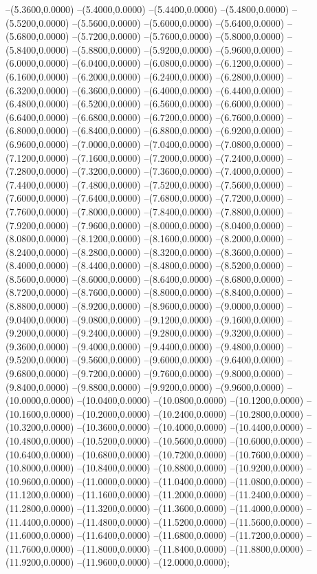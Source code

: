 {	--(5.3600,0.0000)
	--(5.4000,0.0000)
	--(5.4400,0.0000)
	--(5.4800,0.0000)
	--(5.5200,0.0000)
	--(5.5600,0.0000)
	--(5.6000,0.0000)
	--(5.6400,0.0000)
	--(5.6800,0.0000)
	--(5.7200,0.0000)
	--(5.7600,0.0000)
	--(5.8000,0.0000)
	--(5.8400,0.0000)
	--(5.8800,0.0000)
	--(5.9200,0.0000)
	--(5.9600,0.0000)
	--(6.0000,0.0000)
	--(6.0400,0.0000)
	--(6.0800,0.0000)
	--(6.1200,0.0000)
	--(6.1600,0.0000)
	--(6.2000,0.0000)
	--(6.2400,0.0000)
	--(6.2800,0.0000)
	--(6.3200,0.0000)
	--(6.3600,0.0000)
	--(6.4000,0.0000)
	--(6.4400,0.0000)
	--(6.4800,0.0000)
	--(6.5200,0.0000)
	--(6.5600,0.0000)
	--(6.6000,0.0000)
	--(6.6400,0.0000)
	--(6.6800,0.0000)
	--(6.7200,0.0000)
	--(6.7600,0.0000)
	--(6.8000,0.0000)
	--(6.8400,0.0000)
	--(6.8800,0.0000)
	--(6.9200,0.0000)
	--(6.9600,0.0000)
	--(7.0000,0.0000)
	--(7.0400,0.0000)
	--(7.0800,0.0000)
	--(7.1200,0.0000)
	--(7.1600,0.0000)
	--(7.2000,0.0000)
	--(7.2400,0.0000)
	--(7.2800,0.0000)
	--(7.3200,0.0000)
	--(7.3600,0.0000)
	--(7.4000,0.0000)
	--(7.4400,0.0000)
	--(7.4800,0.0000)
	--(7.5200,0.0000)
	--(7.5600,0.0000)
	--(7.6000,0.0000)
	--(7.6400,0.0000)
	--(7.6800,0.0000)
	--(7.7200,0.0000)
	--(7.7600,0.0000)
	--(7.8000,0.0000)
	--(7.8400,0.0000)
	--(7.8800,0.0000)
	--(7.9200,0.0000)
	--(7.9600,0.0000)
	--(8.0000,0.0000)
	--(8.0400,0.0000)
	--(8.0800,0.0000)
	--(8.1200,0.0000)
	--(8.1600,0.0000)
	--(8.2000,0.0000)
	--(8.2400,0.0000)
	--(8.2800,0.0000)
	--(8.3200,0.0000)
	--(8.3600,0.0000)
	--(8.4000,0.0000)
	--(8.4400,0.0000)
	--(8.4800,0.0000)
	--(8.5200,0.0000)
	--(8.5600,0.0000)
	--(8.6000,0.0000)
	--(8.6400,0.0000)
	--(8.6800,0.0000)
	--(8.7200,0.0000)
	--(8.7600,0.0000)
	--(8.8000,0.0000)
	--(8.8400,0.0000)
	--(8.8800,0.0000)
	--(8.9200,0.0000)
	--(8.9600,0.0000)
	--(9.0000,0.0000)
	--(9.0400,0.0000)
	--(9.0800,0.0000)
	--(9.1200,0.0000)
	--(9.1600,0.0000)
	--(9.2000,0.0000)
	--(9.2400,0.0000)
	--(9.2800,0.0000)
	--(9.3200,0.0000)
	--(9.3600,0.0000)
	--(9.4000,0.0000)
	--(9.4400,0.0000)
	--(9.4800,0.0000)
	--(9.5200,0.0000)
	--(9.5600,0.0000)
	--(9.6000,0.0000)
	--(9.6400,0.0000)
	--(9.6800,0.0000)
	--(9.7200,0.0000)
	--(9.7600,0.0000)
	--(9.8000,0.0000)
	--(9.8400,0.0000)
	--(9.8800,0.0000)
	--(9.9200,0.0000)
	--(9.9600,0.0000)
	--(10.0000,0.0000)
	--(10.0400,0.0000)
	--(10.0800,0.0000)
	--(10.1200,0.0000)
	--(10.1600,0.0000)
	--(10.2000,0.0000)
	--(10.2400,0.0000)
	--(10.2800,0.0000)
	--(10.3200,0.0000)
	--(10.3600,0.0000)
	--(10.4000,0.0000)
	--(10.4400,0.0000)
	--(10.4800,0.0000)
	--(10.5200,0.0000)
	--(10.5600,0.0000)
	--(10.6000,0.0000)
	--(10.6400,0.0000)
	--(10.6800,0.0000)
	--(10.7200,0.0000)
	--(10.7600,0.0000)
	--(10.8000,0.0000)
	--(10.8400,0.0000)
	--(10.8800,0.0000)
	--(10.9200,0.0000)
	--(10.9600,0.0000)
	--(11.0000,0.0000)
	--(11.0400,0.0000)
	--(11.0800,0.0000)
	--(11.1200,0.0000)
	--(11.1600,0.0000)
	--(11.2000,0.0000)
	--(11.2400,0.0000)
	--(11.2800,0.0000)
	--(11.3200,0.0000)
	--(11.3600,0.0000)
	--(11.4000,0.0000)
	--(11.4400,0.0000)
	--(11.4800,0.0000)
	--(11.5200,0.0000)
	--(11.5600,0.0000)
	--(11.6000,0.0000)
	--(11.6400,0.0000)
	--(11.6800,0.0000)
	--(11.7200,0.0000)
	--(11.7600,0.0000)
	--(11.8000,0.0000)
	--(11.8400,0.0000)
	--(11.8800,0.0000)
	--(11.9200,0.0000)
	--(11.9600,0.0000)
	--(12.0000,0.0000);
}
